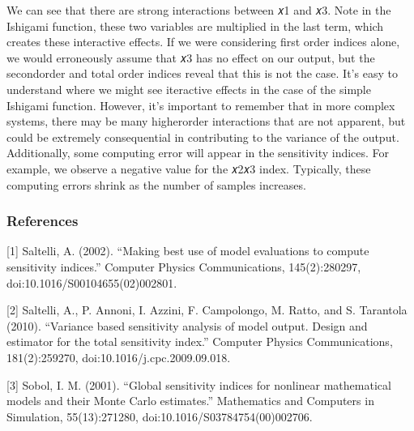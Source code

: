 \documentclass[letterpaper,10pt,english]{book}
\begin{document}
\begin{sphinxVerbatim}[commandchars=\\\{\}]
  
  
  
\end{sphinxVerbatim}

\sphinxAtStartPar
We can see that there are strong interactions between 𝑥1 and 𝑥3. Note in
the Ishigami function, these two variables are multiplied in the last
term, which creates these interactive effects. If we were considering
first order indices alone, we would erroneously assume that 𝑥3 has no
effect on our output, but the second\sphinxhyphen{}order and total order indices
reveal that this is not the case. It’s easy to understand where we might
see iteractive effects in the case of the simple Ishigami function.
However, it’s important to remember that in more complex systems, there
may be many higher\sphinxhyphen{}order interactions that are not apparent, but could
be extremely consequential in contributing to the variance of the
output. Additionally, some computing error will appear in the
sensitivity indices. For example, we observe a negative value for the
𝑥2\sphinxhyphen{}𝑥3 index. Typically, these computing errors shrink as the number of
samples increases.


\subsubsection{References}
\label{\detokenize{A2_Jupyter_Notebooks:references}}
\sphinxAtStartPar
{[}1{]} Saltelli, A. (2002). “Making best use of model evaluations to
compute sensitivity indices.” Computer Physics Communications,
145(2):280\sphinxhyphen{}297, doi:10.1016/S0010\sphinxhyphen{}4655(02)00280\sphinxhyphen{}1.

\sphinxAtStartPar
{[}2{]} Saltelli, A., P. Annoni, I. Azzini, F. Campolongo, M. Ratto, and S.
Tarantola (2010). “Variance based sensitivity analysis of model output.
Design and estimator for the total sensitivity index.” Computer Physics
Communications, 181(2):259\sphinxhyphen{}270, doi:10.1016/j.cpc.2009.09.018.

\sphinxAtStartPar
{[}3{]} Sobol, I. M. (2001). “Global sensitivity indices for nonlinear
mathematical models and their Monte Carlo estimates.” Mathematics and
Computers in Simulation, 55(1\sphinxhyphen{}3):271\sphinxhyphen{}280,
doi:10.1016/S0378\sphinxhyphen{}4754(00)00270\sphinxhyphen{}6.
\end{document}
